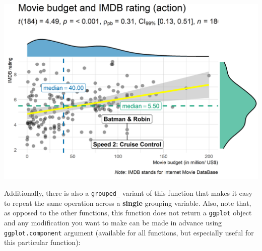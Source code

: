 \documentclass[]{article}
\begin{document}
\includegraphics[width=1\linewidth]{./figures/paper-ggscatterstats2-1}

Additionally, there is also a \texttt{grouped\_} variant of this
function that makes it easy to repeat the same operation across a
\textbf{single} grouping variable. Also, note that, as opposed to the
other functions, this function does not return a \texttt{ggplot} object
and any modification you want to make can be made in advance using
\texttt{ggplot.component} argument (available for all functions, but
especially useful for this particular function):
\end{document}
